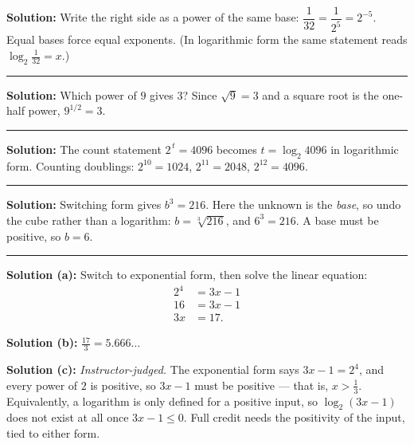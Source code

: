 \documentclass[12pt]{article}
\begin{document}

\textbf{Solution:} Write the right side as a power of the same base:
$\dfrac{1}{32} = \dfrac{1}{2^5} = 2^{-5}$. Equal bases force equal exponents.
(In logarithmic form the same statement reads $\log_2 \tfrac{1}{32} = x$.)

\vspace{0.2cm}\noindent\rule{\linewidth}{0.2pt}\vspace{0.2cm}


\textbf{Solution:} Which power of $9$ gives $3$? Since $\sqrt{9} = 3$ and a
square root is the one-half power, $9^{1/2} = 3$. 

\vspace{0.2cm}\noindent\rule{\linewidth}{0.2pt}\vspace{0.2cm}


\textbf{Solution:} The count statement $2^{\,t} = 4096$ becomes
$t = \log_2 4096$ in logarithmic form. Counting doublings:
$2^{10} = 1024$, $2^{11} = 2048$, $2^{12} = 4096$.

\vspace{0.2cm}\noindent\rule{\linewidth}{0.2pt}\vspace{0.2cm}


\textbf{Solution:} Switching form gives $b^3 = 216$. Here the unknown is the
\emph{base}, so undo the cube rather than a logarithm: $b = \sqrt[3]{216}$, and
$6^3 = 216$. A base must be positive, so $b = 6$. 

\vspace{0.2cm}\noindent\rule{\linewidth}{0.2pt}\vspace{0.2cm}


\textbf{Solution (a):} Switch to exponential form, then solve the linear
equation:
\begin{align*}
  2^4 &= 3x - 1 \\
  16 &= 3x - 1 \\
  3x &= 17 .
\end{align*}

\textbf{Solution (b):} $\tfrac{17}{3} = 5.666\ldots$ 

\textbf{Solution (c):} \emph{Instructor-judged.} The exponential form says
$3x - 1 = 2^4$, and every power of $2$ is positive, so $3x - 1$ must be positive
--- that is, $x > \tfrac{1}{3}$. Equivalently, a logarithm is only defined for a
positive input, so $\log_2(3x-1)$ does not exist at all once $3x - 1 \le 0$.
Full credit needs the positivity of the input, tied to either form.
\end{document}
